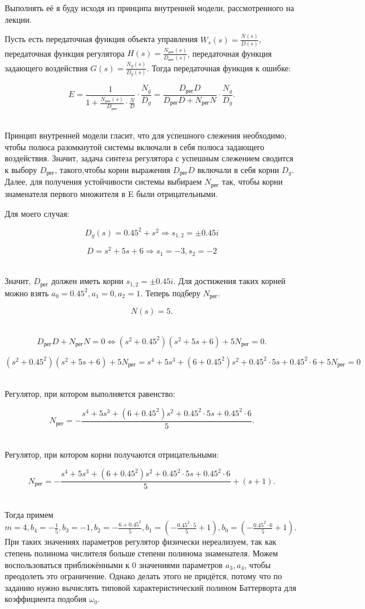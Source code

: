 Выполнять её я буду исходя из принципа внутренней модели, рассмотренного на лекции.\ 

Пусть есть передаточная функция объекта управления $W_s(s) = \frac{N(s)}{D(s)}$, передаточная функция регулятора $ H(s) = \frac{N_{\text{рег}}(s)}{D_{\text{рег}}(s)}$, передаточная функция задающего воздействия $G(s) = \frac{N_g(s)}{D_g(s)}$. Тогда передаточная функция к ошибке:

$$
E = \frac{1}{1 + \frac{N_{\text{рег}}(s)}{D_{\text{рег}}}\cdot\frac{N}{D}}\cdot\frac{N_g}{D_g} = \frac{D_{\text{рег}}D}{D_{\text{рег}}D + N_{\text{рег}}N}\cdot\frac{N_g}{D_g}.
$$\

Принцип внутренней модели гласит, что для успешного слежения необходимо, чтобы полюса разомкнутой системы включали в себя полюса задающего воздействия. Значит, задача синтеза регулятора с успешным слежением сводится к выбору $D_{\text{рег}}$, такого,чтобы корни выражения $D_{\text{рег}}D$ включали в себя корни $D_g$. Далее, для получения устойчивости системы выбираем $N_{\text{рег}}$ так, чтобы корни знаменателя первого множителя в E были отрицательными.\ 

Для моего случая:\

$$D_g(s) = 0.45^2 + s^2 \Rightarrow s_{1, 2} = \pm 0.45i$$

$$
D = s^2+5s+6 \Rightarrow s_1 = -3, s_2 = -2
$$\ 

Значит, $D_{\text{рег}}$ должен иметь корни $s_{1, 2} = \pm 0.45i$. Для достижения таких корней можно взять $a_0 = 0.45^2, a_1 = 0, a_2 = 1$. Теперь подберу $N_{\text{рег}}$.\

$$N(s) = 5.$$\ 

$$D_{\text{рег}}D + N_{\text{рег}}N = 0 \Leftrightarrow (s^2+0.45^2)(s^2+5s+6) + 5N_{\text{рег}} = 0.$$

$$(s^2+0.45^2)(s^2+5s+6) + 5N_{\text{рег}} = s^4 + 5s^3 + (6+0.45^2)s^2 + 0.45^2\cdot5s+0.45^2\cdot 6 + 5N_{\text{рег}} = 0$$\ 

Регулятор, при котором выполняется равенство:

$$N_{\text{рег}} = -\frac{s^4 + 5s^3 + (6+0.45^2)s^2 + 0.45^2\cdot5s+0.45^2\cdot 6}{5}.$$\

Регулятор, при котором корни получаются отрицательными:

$$N_{\text{рег}} = -\frac{s^4 + 5s^3 + (6+0.45^2)s^2 + 0.45^2\cdot5s+0.45^2\cdot 6}{5} + (s+1).$$\

Тогда примем $m = 4, b_4 = -\frac{1}{5}, b_3 = -1, b_2 = -\frac{6+0.45^2}{5}, b_1 = \left(-\frac{0.45^2\cdot5}{5}+1\right), b_0 = \left(-\frac{0.45^2\cdot6}{5}+1\right)$. При таких значениях параметров регулятор физически нереализуем, так как степень полинома числителя больше степени полинома знаменателя. Можем воспользоваться приближёнными к $0$ значениями параметров $a_3, a_4$, чтобы преодолеть это ограничение. Однако делать этого не придётся, потому что по заданию нужно вычислять типовой характеристический полином Баттерворта для коэффициента подобия $\omega_0$.\
